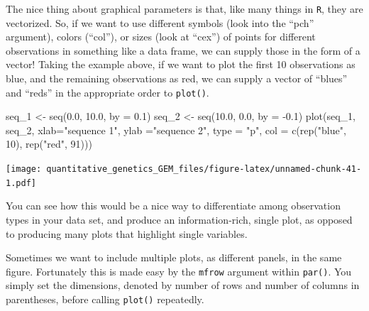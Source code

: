 \documentclass[
]{book}
\newenvironment{Shaded}{\begin{snugshade}}{\end{snugshade}}
\newcommand{\AttributeTok}[1]{\textcolor[rgb]{0.77,0.63,0.00}{#1}}
\newcommand{\DecValTok}[1]{\textcolor[rgb]{0.00,0.00,0.81}{#1}}
\newcommand{\FloatTok}[1]{\textcolor[rgb]{0.00,0.00,0.81}{#1}}
\newcommand{\FunctionTok}[1]{\textcolor[rgb]{0.00,0.00,0.00}{#1}}
\newcommand{\NormalTok}[1]{#1}
\newcommand{\OtherTok}[1]{\textcolor[rgb]{0.56,0.35,0.01}{#1}}
\newcommand{\SpecialCharTok}[1]{\textcolor[rgb]{0.00,0.00,0.00}{#1}}
\newcommand{\StringTok}[1]{\textcolor[rgb]{0.31,0.60,0.02}{#1}}
\begin{document}
The nice thing about graphical parameters is that, like many things in \texttt{R}, they are vectorized. So, if we want to use different symbols (look into the ``pch'' argument), colors (``col''), or sizes (look at ``cex'') of points for different observations in something like a data frame, we can supply those in the form of a vector! Taking the example above, if we want to plot the first 10 observations as blue, and the remaining observations as red, we can supply a vector of ``blues'' and ``reds'' in the appropriate order to \texttt{plot()}.

\begin{Shaded}
\begin{Highlighting}[]
\NormalTok{seq\_1 }\OtherTok{\textless{}{-}} \FunctionTok{seq}\NormalTok{(}\FloatTok{0.0}\NormalTok{, }\FloatTok{10.0}\NormalTok{, }\AttributeTok{by =} \FloatTok{0.1}\NormalTok{)}
\NormalTok{seq\_2 }\OtherTok{\textless{}{-}} \FunctionTok{seq}\NormalTok{(}\FloatTok{10.0}\NormalTok{, }\FloatTok{0.0}\NormalTok{, }\AttributeTok{by =} \SpecialCharTok{{-}}\FloatTok{0.1}\NormalTok{)}
\FunctionTok{plot}\NormalTok{(seq\_1, seq\_2, }\AttributeTok{xlab=}\StringTok{"sequence 1"}\NormalTok{, }\AttributeTok{ylab =}\StringTok{"sequence 2"}\NormalTok{, }\AttributeTok{type =} \StringTok{"p"}\NormalTok{, }
     \AttributeTok{col =} \FunctionTok{c}\NormalTok{(}\FunctionTok{rep}\NormalTok{(}\StringTok{"blue"}\NormalTok{, }\DecValTok{10}\NormalTok{), }\FunctionTok{rep}\NormalTok{(}\StringTok{"red"}\NormalTok{, }\DecValTok{91}\NormalTok{)))}
\end{Highlighting}
\end{Shaded}

\texttt{[image: quantitative\_genetics\_GEM\_files/figure-latex/unnamed-chunk-41-1.pdf]}

You can see how this would be a nice way to differentiate among observation types in your data set, and produce an information-rich, single plot, as opposed to producing many plots that highlight single variables.

Sometimes we want to include multiple plots, as different panels, in the same figure. Fortunately this is made easy by the \texttt{mfrow} argument within \texttt{par()}. You simply set the dimensions, denoted by number of rows and number of columns in parentheses, before calling \texttt{plot()} repeatedly.
\end{document}
